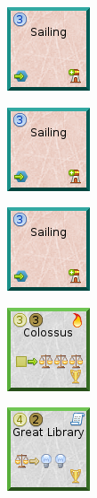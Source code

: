 \documentclass{article}
\begin{document}
\begin{figure}
  \begin{subfigure}{}
    \includegraphics[scale=1]{../rules/png/doe_tech_sailing.png}
  \end{subfigure}
  \begin{subfigure}{}
    \includegraphics[scale=1]{../rules/png/doe_tech_sailing.png}
  \end{subfigure}
  \begin{subfigure}{}
    \includegraphics[scale=1]{../rules/png/doe_tech_sailing.png}
  \end{subfigure}
  \begin{subfigure}{}
    \includegraphics[scale=1]{../rules/png/doe_wonder_colossus.png}
  \end{subfigure}
  \begin{subfigure}{}
    \includegraphics[scale=1]{../rules/png/doe_wonder_great_library.png}
  \end{subfigure}
\end{figure}
\end{document}
